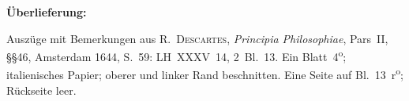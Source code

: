 %  
%
%
%
%
%
%
\frenchspacing
%
\begin{ledgroupsized}[r]{120mm}
\footnotesize
\pstart
\noindent\textbf{Überlieferung:}
\pend
\end{ledgroupsized}
%
\begin{ledgroupsized}[r]{114mm}
\footnotesize
\pstart \parindent -6mm
%
Auszüge mit Bemerkungen aus 
\protect{}\textsc{R.~Descartes},
\cite{00035}\textit{Principia Philosophiae}, Pars~II, §§46, Amsterdam 1644, S.~59:
LH~XXXV~14, 2~Bl.~13. 
Ein Blatt~4\textsuperscript{o};
italienisches Papier;
oberer und linker Rand beschnitten.
Eine Seite auf Bl.~13~r\textsuperscript{o}; Rückseite leer.
\pend
\end{ledgroupsized}
%
%
\vspace{5mm}
